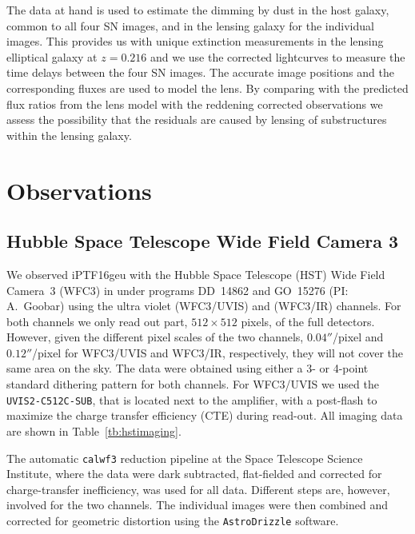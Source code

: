 \documentclass[a4paper,fleqn,usenatbib]{mnras}
\newcommand{\geu}{iPTF16geu\xspace}
\newcommand{\sn}{SN\xspace}
\newcommand{\wfc}{WFC3\xspace}
\newcommand{\wfcuvis}{WFC3/UVIS\xspace}
\newcommand{\wfcir}{WFC3/IR\xspace}
\newcommand{\uvisaperture}{{\tt UVIS2-C512C-SUB}\xspace}
\newcommand{\iraperture}{{\tt IRSUB512}\xspace}
\begin{document}
The data at hand is used to estimate the dimming by dust in the host galaxy, common to all four \sn images, and in the lensing galaxy for the individual images. This provides us with unique extinction measurements in the lensing elliptical galaxy at $z=0.216$ and we use the corrected lightcurves to measure the time delays between the four \sn images. The accurate image positions and the corresponding fluxes are used to model the lens. By comparing with the predicted flux ratios from the lens model with the reddening corrected observations we assess the possibility that the residuals are caused by lensing of substructures within the lensing galaxy.  

\section{Observations}
\subsection{Hubble Space Telescope Wide Field Camera 3}
We observed \geu with the Hubble Space Telescope (HST) Wide Field Camera~3 (\wfc) in under programs DD~14862 and 
GO~15276 (PI: A.~Goobar) using the ultra violet (\wfcuvis) and (\wfcir) channels.  For both channels we only read out part, 
$512\times512$ pixels, of the full detectors.  However, given the different pixel scales of the two channels, 
$0.04''$/pixel and $0.12''$/pixel for \wfcuvis and \wfcir, respectively, they will not cover the same area on the sky.  
The data were obtained using either a 3- or 4-point standard dithering pattern for both channels.  For \wfcuvis we used 
the \uvisaperture, that is located next to the amplifier, with a post-flash to maximize the charge transfer efficiency (CTE) 
during read-out.  All imaging data are shown in Table~\ref{tb:hstimaging}.

\begin{table}
\centering
\caption{Hubble Space Telescope Wide Field Camera 3 data imaging data presented here.  The columns are the civil date, 
the Modified Julian Date (MJD), the HST passband, total exposure time, the number of sub-exposures, and the \wfc camera.  
The \wfcuvis and \wfcir data were obtained with the  \uvisaperture and \iraperture subarray, respectively.  \label{tb:hstimaging}}

\end{table}

The automatic \texttt{calwf3} reduction pipeline at the Space Telescope Science Institute, where the data were dark subtracted, 
flat-fielded and corrected for charge-transfer inefficiency, was used for all data. Different steps are, however, involved for the two
channels.  The individual images were then combined and corrected for geometric distortion using the \texttt{AstroDrizzle} software.
\end{document}
